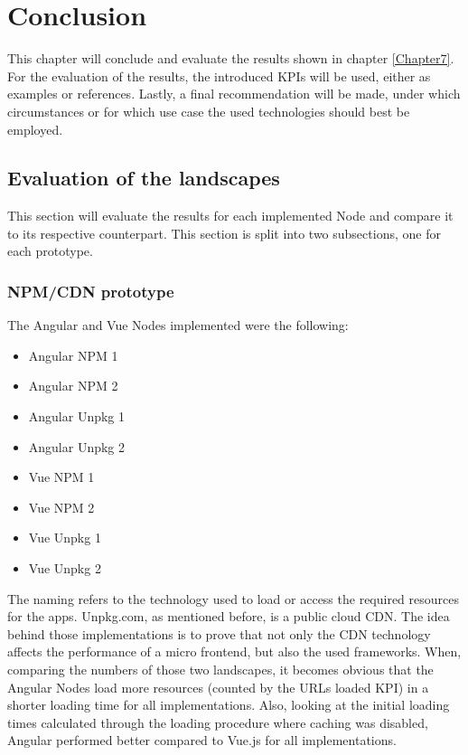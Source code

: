 \chapter{Conclusion} %
\label{Chapter8}


This chapter will conclude and evaluate the results shown in chapter \ref{Chapter7}. For the evaluation of the results, the introduced KPIs will be used, either as examples or references.
Lastly, a final recommendation will be made, under which circumstances or for which use case the used technologies should best be employed.
 
\section{Evaluation of the landscapes}

This section will evaluate the results for each implemented Node and compare it to its respective counterpart. This section is split into two subsections, one for each prototype.

\subsection{NPM/CDN prototype}

The Angular and Vue Nodes implemented were the following:

\begin{itemize}[noitemsep]
	\item Angular NPM 1
	\item Angular NPM 2
	\item Angular Unpkg 1
	\item Angular Unpkg 2
	\item Vue NPM 1
	\item Vue NPM 2
	\item Vue Unpkg 1
	\item Vue Unpkg 2
\end{itemize}

The naming refers to the technology used to load or access the required resources for the apps. 
Unpkg.com, as mentioned before, is a public cloud CDN. The idea behind those implementations is to prove that not only the CDN technology affects the performance of a micro frontend, but also the used frameworks.
When, comparing the numbers of those two landscapes, it becomes obvious that the Angular Nodes load more resources (counted by the URLs loaded KPI) in a shorter loading time for all implementations. 
Also, looking at the initial loading times calculated through the loading procedure where caching was disabled, Angular performed better compared to Vue.js for all implementations.

